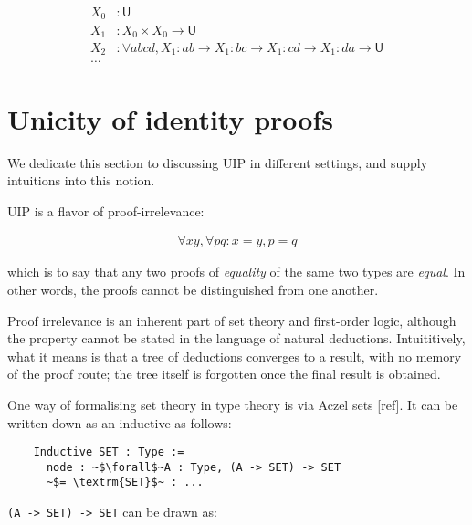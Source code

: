 \documentclass[10pt]{art}
\newcommand{\sort}[1]{\ensuremath{\mathsf{U}_{#1}}}
\begin{document}
\begin{align*}
  X_0 & : \sort{}                                                                                                      \\
  X_1 & : X_0 \times X_0 \rightarrow \sort{}                                                                           \\
  X_2 & : \forall a b c d, X_1 : ab \rightarrow X_1 : bc \rightarrow X_1 : cd \rightarrow X_1 : da \rightarrow \sort{} \\
  \ldots
\end{align*}

\section{Unicity of identity proofs\label{sec:uip}}
We dedicate this section to discussing UIP in different settings, and supply intuitions into this notion.

UIP is a flavor of proof-irrelevance:

\begin{align*}
  \forall x y, \forall p q : x = y, p = q
\end{align*}

which is to say that any two proofs of \emph{equality} of the same two types are \emph{equal}. In other words, the proofs cannot be distinguished from one another.

Proof irrelevance is an inherent part of set theory and first-order logic, although the property cannot be stated in the language of natural deductions. Intuititively, what it means is that a tree of deductions converges to a result, with no memory of the proof route; the tree itself is forgotten once the final result is obtained.

One way of formalising set theory in type theory is via Aczel sets [ref]. It can be written down as an inductive as follows:

\begin{listing}[H]
  \begin{verbatim}
    Inductive SET : Type :=
      node : ~$\forall$~A : Type, (A -> SET) -> SET
      ~$=_\textrm{SET}$~ : ...
  \end{verbatim}
\end{listing}

\texttt{(A -> SET) -> SET} can be drawn as:
\end{document}
